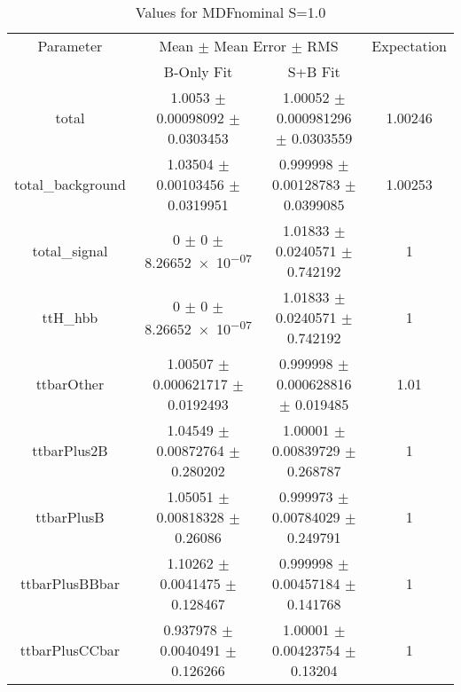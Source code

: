 \begin{table}
\centering
\caption{Values for MDFnominal S=1.0}
\begin{tabular}{cccc}
\toprule
Parameter & \multicolumn{2}{c}{Mean $\pm$ Mean Error $\pm$ RMS} & Expectation\\
 & B-Only Fit & S+B Fit & \\
\midrule
total & \num{1.0053} $\pm$ \num{0.00098092} $\pm$ \num{0.0303453} & \num{1.00052} $\pm$ \num{0.000981296} $\pm$ \num{0.0303559} & \num{1.00246}\\
total\_background & \num{1.03504} $\pm$ \num{0.00103456} $\pm$ \num{0.0319951} & \num{0.999998} $\pm$ \num{0.00128783} $\pm$ \num{0.0399085} & \num{1.00253}\\
total\_signal & \num{0} $\pm$ \num{0} $\pm$ \num{8.26652e-07} & \num{1.01833} $\pm$ \num{0.0240571} $\pm$ \num{0.742192} & \num{1}\\
ttH\_hbb & \num{0} $\pm$ \num{0} $\pm$ \num{8.26652e-07} & \num{1.01833} $\pm$ \num{0.0240571} $\pm$ \num{0.742192} & \num{1}\\
ttbarOther & \num{1.00507} $\pm$ \num{0.000621717} $\pm$ \num{0.0192493} & \num{0.999998} $\pm$ \num{0.000628816} $\pm$ \num{0.019485} & \num{1.01}\\
ttbarPlus2B & \num{1.04549} $\pm$ \num{0.00872764} $\pm$ \num{0.280202} & \num{1.00001} $\pm$ \num{0.00839729} $\pm$ \num{0.268787} & \num{1}\\
ttbarPlusB & \num{1.05051} $\pm$ \num{0.00818328} $\pm$ \num{0.26086} & \num{0.999973} $\pm$ \num{0.00784029} $\pm$ \num{0.249791} & \num{1}\\
ttbarPlusBBbar & \num{1.10262} $\pm$ \num{0.0041475} $\pm$ \num{0.128467} & \num{0.999998} $\pm$ \num{0.00457184} $\pm$ \num{0.141768} & \num{1}\\
ttbarPlusCCbar & \num{0.937978} $\pm$ \num{0.0040491} $\pm$ \num{0.126266} & \num{1.00001} $\pm$ \num{0.00423754} $\pm$ \num{0.13204} & \num{1}\\
\bottomrule
\end{tabular}
\end{table}